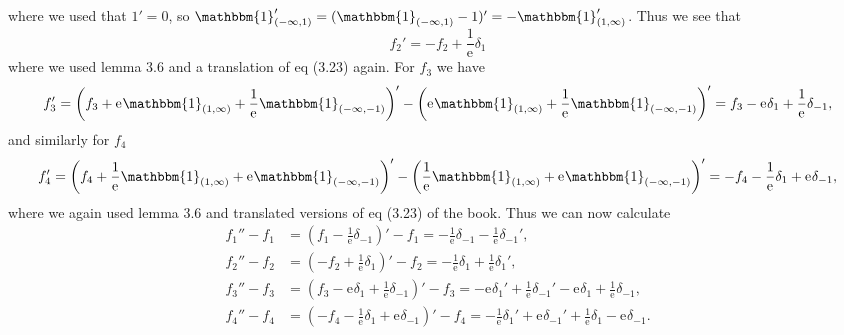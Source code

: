 \documentclass[a4paper,11pt]{article}
\newcommand{\euler}[1]{\text{e}^{#1}}
\numberwithin{equation}{section}
\begin{document}
where we used that $ 1'=0 $, so $ \mathbbm{1}_{(-\infty,1)}'=(\mathbbm{1}_{(-\infty,1)}-1)'=-\mathbbm{1}_{(1,\infty)}' $. Thus we see that \begin{equation}
f_2'=-f_2+\frac{1}{\euler{}}\delta_1
\end{equation}
where we used lemma 3.6 and a translation of eq (3.23) again. For $ f_3 $ we have \begin{equation}
\begin{aligned}
f_3'=\left(f_3+\euler{}\mathbbm{1}_{(1,\infty)}+\frac{1}{\euler{}}\mathbbm{1}_{(-\infty,-1)}\right)'-\left(\euler{}\mathbbm{1}_{(1,\infty)}+\frac{1}{\euler{}}\mathbbm{1}_{(-\infty,-1)}\right)'=f_3-\euler{}\delta_1+\frac{1}{\euler{}}\delta_{-1},
\end{aligned}
\end{equation}
and similarly for $ f_4 $
\begin{equation}
\begin{aligned}
f_4'=\left(f_4+\frac{1}{\euler{}}\mathbbm{1}_{(1,\infty)}+\euler{}\mathbbm{1}_{(-\infty,-1)}\right)'-\left(\frac{1}{\euler{}}\mathbbm{1}_{(1,\infty)}+\euler{}\mathbbm{1}_{(-\infty,-1)}\right)'=-f_4-\frac{1}{\euler{}}\delta_1+\euler{}\delta_{-1},
\end{aligned}
\end{equation}
where we again used lemma 3.6 and translated versions of eq (3.23) of the book.
Thus we can now calculate
\begin{equation}\label{LinEqSys}
	\begin{aligned}
	f_1''-f_1&=\left(f_1-\frac{1}{\euler{}}\delta_{-1}\right)'-f_1=-\frac{1}{\euler{}}\delta_{-1}-\frac{1}{\euler{}}\delta_{-1}',\\
	f_2''-f_2&=\left(-f_2+\frac{1}{\euler{}}\delta_{1}\right)'-f_2=-\frac{1}{\euler{}}\delta_1+\frac{1}{\euler{}}\delta_1',\\
	f_3''-f_3&=\left(f_3-\euler{}\delta_1+\frac{1}{\euler{}}\delta_{-1}\right)'-f_3=-\euler{}\delta_1'+\frac{1}{\euler{}}\delta_{-1}'-\euler{}\delta_1+\frac{1}{\euler{}}\delta_{-1},\\
	f_4''-f_4&=\left(-f_4-\frac{1}{\euler{}}\delta_1+\euler{}\delta_{-1}\right)'-f_4=-\frac{1}{\euler{}}\delta_1'+\euler{}\delta_{-1}'+\frac{1}{\euler{}}\delta_1-\euler{}\delta_{-1}.
	\end{aligned}
\end{equation}
%
\end{document}
